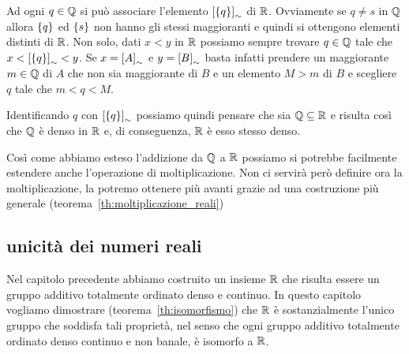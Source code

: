 Ad ogni $q\in {\mathbb Q}$ si può associare l'elemento ${\left[ {\left\{ q \right\}} \right]}_\sim$ 
di ${\mathbb R}$. Ovviamente se $q\neq s$ in ${\mathbb Q}$ allora ${\left\{ q \right\}}$ 
ed ${\left\{ s \right\}}$ non hanno gli stessi maggioranti e quindi si ottengono 
elementi distinti di ${\mathbb R}$. 
Non solo, dati $x<y$ in ${\mathbb R}$ possiamo sempre trovare $q\in {\mathbb Q}$ tale che 
$x < {\left[ {\left\{ q \right\}} \right]}_\sim < y$. 
Se $x={\left[ A \right]}_\sim$ e $y={\left[ B \right]}_\sim$
basta infatti prendere un maggiorante $m\in {\mathbb Q}$ di $A$ che non sia maggiorante di $B$
e un elemento $M>m$ di $B$ e scegliere $q$ tale che $m<q<M$.

Identificando $q$ con ${\left[ {\left\{ q \right\}} \right]}_\sim$ 
possiamo quindi pensare che sia ${\mathbb Q} \subseteq {\mathbb R}$ e risulta così che ${\mathbb Q}$ è denso in 
${\mathbb R}$ e, di conseguenza, ${\mathbb R}$ è esso stesso denso.

Così come abbiamo esteso l'addizione da ${\mathbb Q}$ a ${\mathbb R}$ possiamo
si potrebbe facilmente estendere anche l'operazione di moltiplicazione.
% 
Non ci servirà però definire ora la moltiplicazione, la potremo ottenere 
più avanti grazie ad una costruzione più generale (teorema~\ref{th:moltiplicazione_reali})

\subsection{unicità dei numeri reali}

Nel capitolo precedente abbiamo costruito un insieme ${\mathbb R}$ 
che risulta essere un gruppo additivo totalmente ordinato 
denso e continuo. 
In questo capitolo vogliamo dimostrare (teorema~\ref{th:isomorfismo})
che ${\mathbb R}$ è sostanzialmente l'unico gruppo che soddisfa 
tali proprietà, nel senso che ogni gruppo additivo totalmente ordinato 
denso continuo e non banale, è isomorfo a ${\mathbb R}$.



